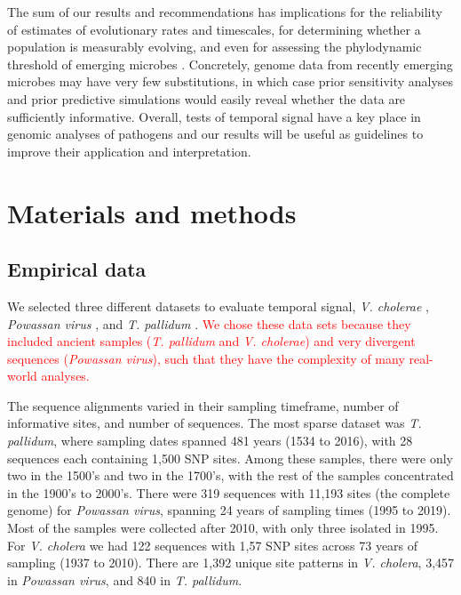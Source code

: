 \documentclass[10pt,letterpaper]{article}
\begin{document}
The sum of our results and recommendations has implications for the reliability of estimates of evolutionary rates and timescales, for determining whether a population is measurably evolving, and even for assessing the phylodynamic threshold of emerging microbes \cite{duchene2020temporal}. Concretely, genome data from recently emerging microbes may have very few substitutions, in which case prior sensitivity analyses and prior predictive simulations would easily reveal whether the data are sufficiently informative. Overall, tests of temporal signal have a key place in genomic analyses of pathogens and our results will be useful as guidelines to improve their application and interpretation.

\section*{Materials and methods}
\subsection*{Empirical data}
We selected three different datasets to evaluate temporal signal, \textit{V. cholerae} \cite{devault2014second}, \textit{Powassan virus} \cite{vogels2023phylogeographic}, and \textit{T. pallidum} \cite{majander2020ancient}. \textcolor{red}{We chose these data sets because they included ancient samples (\textit{T. pallidum} and \textit{V. cholerae}) and very divergent sequences (\textit{Powassan virus}), such that they have the complexity of many real-world analyses.}

The sequence alignments varied in their sampling timeframe, number of informative sites, and number of sequences. The most sparse dataset was \textit{T. pallidum}, where sampling dates spanned 481 years (1534 to 2016), with 28 sequences each containing 1,500 SNP sites. Among these samples, there were only two in the 1500's and two in the 1700's, with the rest of the samples concentrated in the 1900's to 2000's. There were 319 sequences with 11,193 sites (the complete genome) for \textit{Powassan virus}, spanning 24 years of sampling times (1995 to 2019). Most of the samples were collected after 2010, with only three isolated in 1995. For \textit{V. cholera} we had 122  sequences with 1,57 SNP sites across 73 years of sampling (1937 to 2010). There are 1,392 unique site patterns in \textit{V. cholera}, 3,457 in \textit{Powassan virus}, and 840 in \textit{T. pallidum}. 
\end{document}
